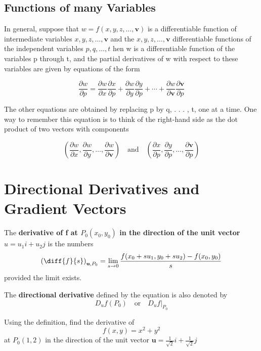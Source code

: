 \documentclass[12pt,a4paper]{article}
\newenvironment{definition}{\begin{definitionbox}}{\end{definitionbox}\vspace{1\baselineskip}}
\begin{document}
\subsection{Functions of many Variables}

In general, suppose that \(w = f(x,y,z, \dots, \mathbf{v})\) is a differentiable function of intermediate variables \(x,y,z, \dots, \mathbf{v}\) and the \(x,y,z, \dots, \mathbf{v}\) differentiable functions of the independent variables \(p,q, \dots, t\) hen w is a differentiable
function of the variables p through t, and the partial derivatives of w with respect to these variables are given by equations of the form

\[\frac{\partial w}{\partial p}=\frac{\partial w}{\partial x} \frac{\partial x}{\partial p}+\frac{\partial w}{\partial y} \frac{\partial y}{\partial p}+\cdots+\frac{\partial w}{\partial \boldsymbol{v}} \frac{\partial \boldsymbol{v}}{\partial p}\]


The other equations are obtained by replacing p by q, . . . , t, one at a time. One way to remember this equation is to think of the right-hand side as the dot product of two vectors with components

\[\left(\frac{\partial w}{\partial x}, \frac{\partial w}{\partial y}, \dots, \frac{\partial w}{\partial \mathbf{v}}\right) \quad \text{and} \quad \left(\frac{\partial x}{\partial p}, \frac{\partial y}{\partial p}, \dots, \frac{\partial \mathbf{v}}{\partial p}\right)\]


\section{Directional Derivatives and Gradient Vectors}

\begin{definition}
    The \textbf{derivative of f at \(P_0(x_0,y_0)\) in the direction of the unit vector \(u = u_1i + u_2j\)} is the numbers
    \[\left(\diff{f}{s}\right)_{\mathbf{u}, P_0} = \lim_{s \to 0}\frac{f(x_0+ su_1, y_0 + su_2) - f(x_0,y_0)}{s}\]
    provided the limit exists.
\end{definition}

The \textbf{directional derivative} defined by the equation is also denoted by
\[D_uf(P_0) \quad \text{or} \quad D_uf|_{P_0} \]

\begin{example}
    Using the definition, find the derivative of
    \[f(x,y)= x^2 + y^2\]
    at \(P_0(1,2)\) in the direction of the unit vector \(\mathbf{u} = \frac{1}{\sqrt{2}}i + \frac{1}{\sqrt{2}}j \)
\end{example}
\end{document}
